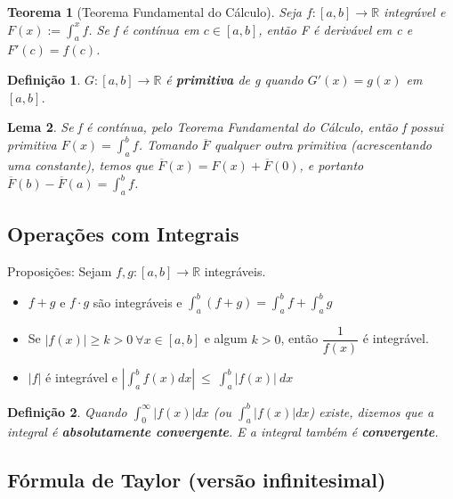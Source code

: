 \documentclass[12pt]{article}
\newtheorem{theorem}{Teorema}[section]
\newtheorem{lemma}[theorem]{Lema}
\newtheorem{definition}{Definição}
\begin{document}
\begin{theorem}[Teorema Fundamental do Cálculo]
    Seja $f:[a, b] \rightarrow{} \mathbb{R}$ integrável e $F(x):= \int_a^x f$. Se f é contínua em $c \in [a, b]$, então F é derivável em c e $F'(c) = f(c)$.
\end{theorem}

\begin{definition}
    $G: [a, b] \rightarrow{} \mathbb{R}$ é \textbf{primitiva} de g quando $G'(x) = g(x)$ em $[a, b]$.
\end{definition}

\begin{lemma}
    Se f é contínua, pelo Teorema Fundamental do Cálculo, então f possui primitiva $F(x) = \int_a^b f$. Tomando $\overline{F}$ qualquer outra primitiva (acrescentando uma constante), temos que $\overline{F} (x) = F(x) + \overline{F} (0)$, e portanto $\overline{F} (b) - \overline{F} (a) = \int_a^b f$.
\end{lemma}

\subsection{Operações com Integrais}
\label{s10}

Proposições:
Sejam $f, g: [a, b] \rightarrow{} \mathbb{R}$ integráveis.
\begin{itemize}
    \item $f +g$ e $f \cdot g$ são integráveis e $\int_a^b (f +g) = \int_a^b f + \int_a^b g$
    
    \item Se $|f(x)| \geq k > 0 \ \forall x \in [a, b]$ e algum $k > 0$, então $\dfrac{1}{f(x)}$ é integrável.
    
    \item $|f|$ é integrável e $|\int_a^b f(x) dx|\ \leq\ \int_a^b |f(x)|\ dx$
\end{itemize}

\begin{definition}
    Quando $\int_0^\infty |f(x)| dx$ (ou $\int_a^b |f(x)| dx$) existe, dizemos que a integral é \textbf{absolutamente convergente}. E a integral também é \textbf{convergente}.
\end{definition}

\subsection{Fórmula de Taylor (versão infinitesimal)}
\label{s11}
\end{document}
